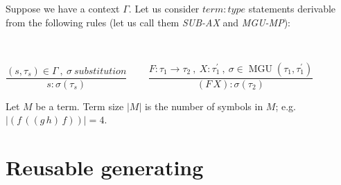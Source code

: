 \documentclass[a4paper,oneside]{memoir}
\begin{document}
\newcommand{\then}{\Rightarrow}
\newcommand{\E}[2]{(\exists #1)\ #2}
\newcommand{\A}[2]{(\forall #1)\ #2}
\newcommand{\Ain}[3]{(\forall #1 \in #2)\ #3}


\newcommand{\op}{\operatorname}

\newcommand{\ar}{\rightarrow}
\newcommand{\ap}[2]{(#1\,#2)}
\newcommand{\defi}{\coloneqq}
\newcommand{\defe}{\mathrel{\vcentcolon\equiv}}

\newcommand{\binRule}[3]{\dfrac{#1\ ,\ #2}{#3}}
\newcommand{\triRule}[4]{\dfrac{#1\ ,\ #2\ , \ #3}{#4}}
\newcommand{\isSub}[1]{#1\ \mathit{substitution}}
\newcommand{\MGU}[2]{\op{MGU}(#1,#2)}

\newcommand{\subAx}{\textit{SUB-AX}\xspace}
\newcommand{\mguMp}{\textit{MGU-MP}\xspace}
\newcommand{\abs}[1]{\lvert #1 \rvert}

Suppose we have a context $\Gamma$. Let us consider $\mathit{term:type}$ statements derivable from the following rules (let us call them \subAx and \mguMp):

~

$\binRule{(s,\tau_s) \in \Gamma}{\isSub{\sigma}}{s : \sigma(\tau_s)}$
~~~
$\triRule{F : \tau_1 \ar \tau_2}{X : \tau^\prime_1}{\sigma \in \MGU{\tau_1}{\tau^\prime_1}}{\ap{F}{X} : \sigma(\tau_2)}$


\begin{definition}
Let $M$ be a term. Term size $\abs{M}$ is the number of symbols in $M$; e.g. $\abs{\ap{f}{\ap{\ap{g}{h}}{f}}} = 4$. 
\end{definition}

\section{Reusable generating}

\newcommand{\inhab}[1]{\op{I}(#1)}


\newcommand{\tord}{\preccurlyeq}
\newcommand{\stord}{\prec}
\newcommand{\ordt}{\tord_\tau}
\newcommand{\tek}{\sim}
\newcommand{\ntek}{\nsim}
\newcommand{\ekt}{\tek_\tau}
\newcommand{\nekt}{\ntek_\tau}
\newcommand{\nsucct}{\nsucc_\tau}


\newcommand{\MGI}[1]{\op{MGI}(#1)}
\newcommand{\MGIt}{\MGI{\tau}}
\newcommand{\It}{\op{I}(\tau)}

\newcommand{\ids}{\sigma_{\op{id}}}

\newcommand{\U}[2]{\op{U}(#1,#2)}
\newcommand{\Utt}{\U{\tau}{\tauPr}}
\newcommand{\MGUtt}{\MGU{\tau}{\tauPr}}
\end{document}
